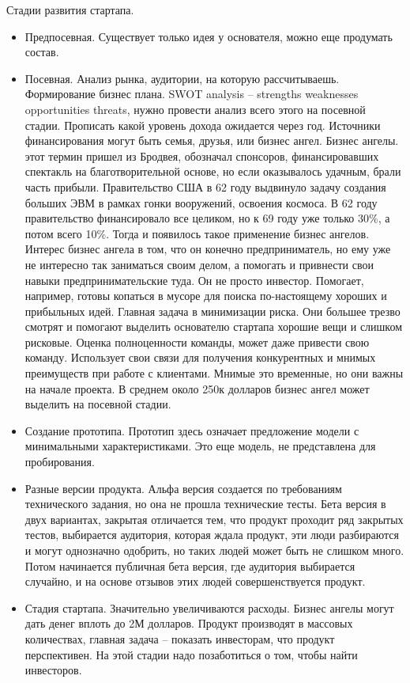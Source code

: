 \documentclass[a4paper, 12pt]{article}
\begin{document}
Стадии развития стартапа. 
\begin{itemize}
\item Предпосевная. Существует только идея у основателя, можно еще продумать состав. 
\item Посевная. Анализ рынка, аудитории, на которую рассчитываешь. Формирование бизнес плана. SWOT analysis -- strengths weaknesses opportunities threats, нужно провести анализ всего этого на посевной стадии. Прописать какой уровень дохода ожидается через год. Источники финансирования могут быть семья, друзья, или бизнес ангел. Бизнес ангелы. этот термин пришел из Бродвея, обозначал спонсоров, финансировавших спектакль на благотворительной основе, но если оказывалось удачным, брали часть прибыли. Правительство США в 62 году выдвинуло задачу создания больших ЭВМ в рамках гонки вооружений, освоения космоса. В 62 году правительство финансировало все целиком, но к 69 году уже только 30\%, а потом всего 10\%. Тогда и появилось такое применение бизнес ангелов. Интерес бизнес ангела в том, что он конечно предприниматель, но ему уже не интересно так заниматься своим делом, а помогать и привнести свои навыки предпринимательские туда. Он не просто инвестор. Помогает, например, готовы копаться в мусоре для поиска по-настоящему хороших и прибыльных идей. Главная задача в минимизации риска. Они большее трезво смотрят и помогают выделить основателю стартапа хорошие вещи и слишком рисковые. Оценка полноценности команды, может даже привести свою команду. Использует свои связи для получения конкурентных и мнимых преимуществ при работе с клиентами. Мнимые это временные, но они важны на начале проекта. В среднем около 250к долларов бизнес ангел может выделить на посевной стадии. 
\item Создание прототипа. Прототип здесь означает предложение модели с минимальными характеристиками. Это еще модель, не представлена для пробирования. 
\item Разные версии продукта. Альфа версия создается по требованиям технического задания, но она не прошла технические тесты. Бета версия в двух вариантах, закрытая отличается тем, что продукт проходит ряд закрытых тестов, выбирается аудитория, которая ждала продукт, эти люди разбираются и могут однозначно одобрить, но таких людей может быть не слишком много. Потом начинается публичная бета версия, где аудитория выбирается случайно, и на основе отзывов этих людей совершенствуется продукт. 
\item Стадия стартапа. Значительно увеличиваются расходы. Бизнес ангелы могут дать денег вплоть до 2М долларов. Продукт производят в массовых количествах, главная задача -- показать инвесторам, что продукт перспективен. На этой стадии надо позаботиться о том, чтобы найти инвесторов. 

\end{itemize}
\end{document}
